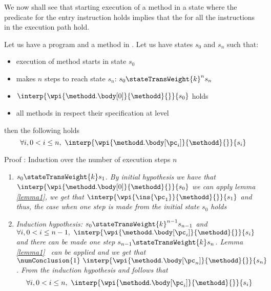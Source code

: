 \Qed

We now shall see that starting execution of a method in a state where the \fwpi{}
 predicate for the entry instruction holds implies that the  
\fwpi{} for all the instructions in the execution path hold. 

\begin{lemma}\label{lemma3}
Let us have a program \Program{} and a method \methodd{} in \Program.
 Let us have states  $s_{0}$ and $s_n$ such that: 
\begin{itemize} 
     \item execution of method  \methodd{} starts  in state $s_{0}$ 
     \item  makes $n$ steps to reach state $s_n$: $s_{0} \stateTransWeight{k}^{n} s_{n} $
     \item $\interp{ \wpi{\methodd.\body[0] } {\methodd}{}}{ s_{0}}$ holds
     \item all methods in \Program{} respect their specification at level   
\end{itemize}  
 then the following holds
$$\forall i,  0 < i \le n, \  \interp{ \wpi{\methodd.\body[\pc_i] } {\methodd}{ }}{ s_{i}} $$

\end{lemma}
Proof : Induction over the number of execution steps $n$
\begin{enumerate}
    \item\textit{ $s_{0} \stateTransWeight{k} s_{1}$. By initial hypothesis we have that  $\interp{ \wpi{\methodd.\body[0] } {\methodd}{}}{ s_{0}}$
             we can apply lemma \ref{lemma1}, we get that 
             $\interp{ \wpi{\ins{\pc_{1}}}{\methodd}{  } } { s_{1} }  $ and thus, the  case when one step is made from the initial state
             $s_0$  holds}   
    \item \textit{Induction hypothesis:   $s_{0} \stateTransWeight{k}^{n - 1} s_{n - 1}$ and \\
           $\forall i,  0 < i \le n - 1, \  \interp{ \wpi{\methodd.\body[\pc_i] } {\methodd}{}}{ s_{i}} $
           and there can be made one step $s_{n- 1} \stateTransWeight{k} s_n$.  Lemma \ref{lemma1} \ can be applied and we get that
           $\numConclusion{1} \ \interp{ \wpi{\methodd.\body[\pc_n] } {\methodd}{ } }{ s_{n}} $. 
	   From the induction hypothesis and  follows that 
	   $$\forall i,  0 < i \le n, \  \interp{ \wpi{\methodd.\body[\pc_i] } {\methodd}{ }}{ s_{i}} $$ }
\end{enumerate}
\Qed \\

